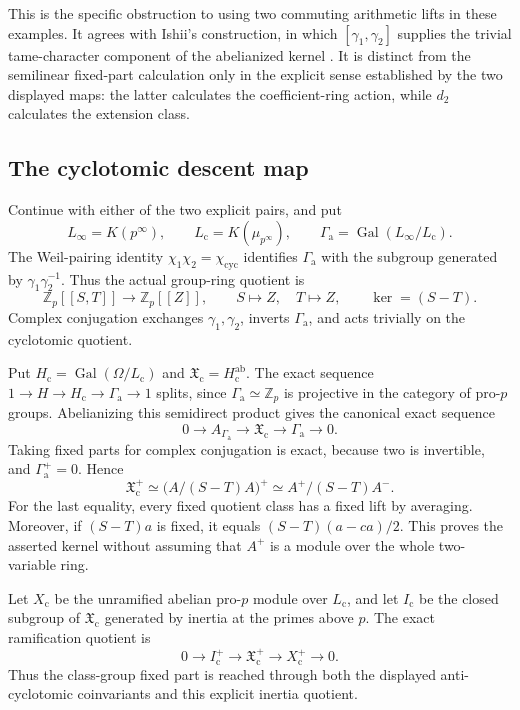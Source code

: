 \documentclass[11pt]{article}
\theoremstyle{definition}\newtheorem{definition}[theorem]{Definition}
\begin{document}
This is the specific obstruction to using two commuting
arithmetic lifts in these examples. It agrees with Ishii's
construction, in which \([\gamma_1,\gamma_2]\) supplies the
trivial tame-character component of the abelianized kernel
\cite[\S4.1--4.2]{Ishii}. It is distinct from the
semilinear fixed-part calculation only in the explicit
sense established by the two displayed maps: the latter
calculates the coefficient-ring action, while \(d_2\)
calculates the extension class.

\subsection{The cyclotomic descent map}

Continue with either of the two explicit pairs, and put
\[
 L_\infty=K(p^\infty),\qquad
 L_{\mathrm c}=K(\mu_{p^\infty}),\qquad
 \Gamma_{\mathrm a}=\operatorname{Gal}(L_\infty/L_{\mathrm c}).
\]
The Weil-pairing identity \(\chi_1\chi_2=\chi_{\mathrm{cyc}}\)
identifies \(\Gamma_{\mathrm a}\) with the subgroup generated
by \(\gamma_1\gamma_2^{-1}\). Thus the actual group-ring quotient is
\[
 \mathbb Z_p[[S,T]]\longrightarrow\mathbb Z_p[[Z]],
 \qquad S\longmapsto Z,\quad T\longmapsto Z,
 \qquad \ker=(S-T).
\]
Complex conjugation exchanges \(\gamma_1,\gamma_2\), inverts
\(\Gamma_{\mathrm a}\), and acts trivially on the cyclotomic
quotient.

Put \(H_{\mathrm c}=\operatorname{Gal}(\Omega/L_{\mathrm c})\)
and \(\mathfrak X_{\mathrm c}=H_{\mathrm c}^{\mathrm{ab}}\).
The exact sequence
\(1\to H\to H_{\mathrm c}\to\Gamma_{\mathrm a}\to1\)
splits, since \(\Gamma_{\mathrm a}\simeq\mathbb Z_p\) is
projective in the category of pro-\(p\) groups. Abelianizing
this semidirect product gives the canonical exact sequence
\[
 0\longrightarrow A_{\Gamma_{\mathrm a}}
  \longrightarrow\mathfrak X_{\mathrm c}
  \longrightarrow\Gamma_{\mathrm a}\longrightarrow0.
\]
Taking fixed parts for complex conjugation is exact, because
two is invertible, and \(\Gamma_{\mathrm a}^+=0\). Hence
\[
 \mathfrak X_{\mathrm c}^+
 \simeq\bigl(A/(S-T)A\bigr)^+
 \simeq A^+/(S-T)A^- .
\]
For the last equality, every fixed quotient class has a
fixed lift by averaging. Moreover, if \((S-T)a\) is fixed,
it equals \((S-T)(a-ca)/2\). This proves the asserted kernel
without assuming that \(A^+\) is a module over the whole
two-variable ring.

Let \(X_{\mathrm c}\) be the unramified abelian pro-\(p\)
module over \(L_{\mathrm c}\), and let \(I_{\mathrm c}\)
be the closed subgroup of \(\mathfrak X_{\mathrm c}\)
generated by inertia at the primes above \(p\).
The exact ramification quotient is
\[
 0\longrightarrow I_{\mathrm c}^+
 \longrightarrow\mathfrak X_{\mathrm c}^+
 \longrightarrow X_{\mathrm c}^+\longrightarrow0.
\]
Thus the class-group fixed part is reached through both
the displayed anti-cyclotomic coinvariants and this
explicit inertia quotient.
\end{document}
